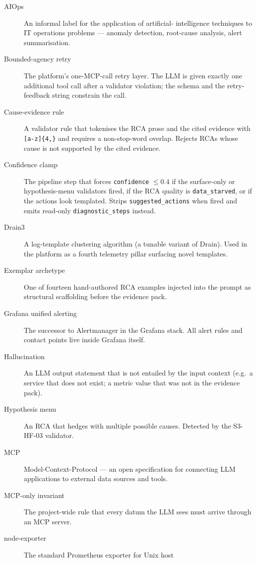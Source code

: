\documentclass[11pt,a4paper,oneside]{report}
\begin{document}
\begin{description}
\item[AIOps] An informal label for the application of artificial-
    intelligence techniques to IT operations problems --- anomaly
    detection, root-cause analysis, alert summarisation.
\item[Bounded-agency retry] The platform's one-MCP-call retry layer.
    The LLM is given exactly one additional tool call after a
    validator violation; the schema and the retry-feedback string
    constrain the call.
\item[Cause-evidence rule] A validator rule that tokenises the RCA
    prose and the cited evidence with \texttt{[a-z]\{4,\}} and
    requires a non-stop-word overlap.  Rejects RCAs whose cause is
    not supported by the cited evidence.
\item[Confidence clamp] The pipeline step that forces
    \texttt{confidence} $\leq 0.4$ if the surface-only or
    hypothesis-menu validators fired, if the RCA quality is
    \texttt{data\_starved}, or if the actions look templated.  Strips
    \texttt{suggested\_actions} when fired and emits read-only
    \texttt{diagnostic\_steps} instead.
\item[Drain3] A log-template clustering algorithm (a tunable variant
    of Drain).  Used in the platform as a fourth telemetry pillar
    surfacing novel templates.
\item[Exemplar archetype] One of fourteen hand-authored RCA examples
    injected into the prompt as structural scaffolding before the
    evidence pack.
\item[Grafana unified alerting] The successor to Alertmanager in the
    Grafana stack.  All alert rules and contact points live inside
    Grafana itself.
\item[Hallucination] An LLM output statement that is not entailed by
    the input context (e.g.\ a service that does not exist; a
    metric value that was not in the evidence pack).
\item[Hypothesis menu] An RCA that hedges with multiple possible
    causes.  Detected by the S3-HF-03 validator.
\item[MCP] Model-Context-Protocol --- an open specification for
    connecting LLM applications to external data sources and tools.
\item[MCP-only invariant] The project-wide rule that every datum the
    LLM sees must arrive through an MCP server.
\item[node-exporter] The standard Prometheus exporter for Unix host

\end{description}
\end{document}
